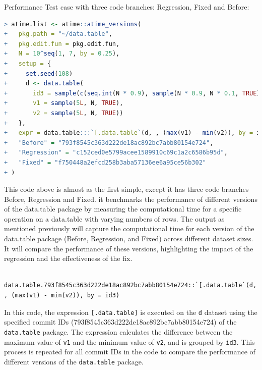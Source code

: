 \noindent Performance Test case with three code branches: Regression, Fixed and Before: \\

\begin{lstlisting}[language=R]
> atime.list <- atime::atime_versions(
+   pkg.path = "~/data.table",
+   pkg.edit.fun = pkg.edit.fun,
+   N = 10^seq(1, 7, by = 0.25),
+   setup = { 
+     set.seed(108)
+     d <- data.table(
+       id3 = sample(c(seq.int(N * 0.9), sample(N * 0.9, N * 0.1, TRUE))),
+       v1 = sample(5L, N, TRUE),
+       v2 = sample(5L, N, TRUE))
+   },
+   expr = data.table:::`[.data.table`(d, , (max(v1) - min(v2)), by = id3),
+   "Before" = "793f8545c363d222de18ac892bc7abb80154e724",
+   "Regression" = "c152ced0e5799acee1589910c69c1a2c6586b95d",
+   "Fixed" = "f750448a2efcd258b3aba57136ee6a95ce56b302"
+ )
\end{lstlisting}

\noindent This code above is almost as the first simple, except it has three code branches Before, Regression and Fixed. it benchmarks the performance of different versions of the data.table package by measuring the computational time for a specific operation on a data.table with varying numbers of rows.
The output as mentioned previously will capture the computational time for each version of the data.table package (Before, Regression, and Fixed) across different dataset sizes. It will compare the performance of these versions, highlighting the impact of the regression and the effectiveness of the fix. \\


    \begin{verbatim}
    data.table.793f8545c363d222de18ac892bc7abb80154e724::`[.data.table`(d, , (max(v1) - min(v2)), by = id3)  
    \end{verbatim}
    
\vspace{0.1in}
\noindent In this code, the expression \texttt{[.data.table]} is executed on the \texttt{d} dataset using the specified commit IDs (793f8545c363d222de18ac892bc7abb80154e724) of the \texttt{data.table} package. The expression calculates the difference between the maximum value of \texttt{v1} and the minimum value of \texttt{v2}, and is grouped by \texttt{id3}. This process is repeated for all commit IDs in the code to compare the performance of different versions of the \texttt{data.table} package.\\

